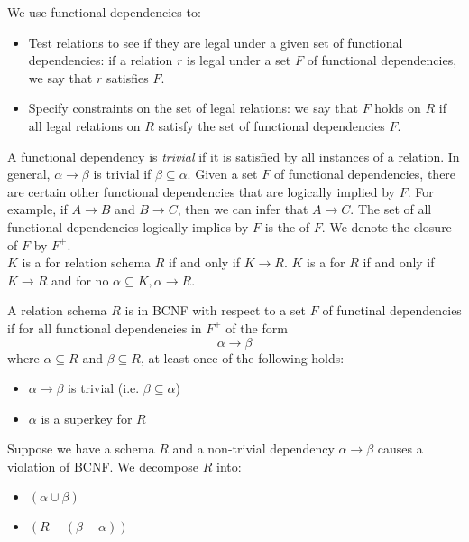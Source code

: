 \documentclass{article}
\begin{document}
We use functional dependencies to: 
\begin{itemize}
  \item Test relations to see if they are legal under a given set of functional dependencies: if a relation $r$ is legal under a set $F$ of functional dependencies, we say that $r$ satisfies $F$. 
  \item Specify constraints on the set of legal relations: we say that $F$ holds on $R$ if all legal relations on $R$ satisfy the set of functional dependencies $F$. 
\end{itemize}
A functional dependency is \emph{trivial} if it is satisfied by all instances of a relation. In general, $\alpha \rightarrow \beta$ is trivial if $\beta \subseteq \alpha$. Given a set $F$ of functional dependencies, there are certain other functional dependencies that are logically implied by $F$. For example, if $A \rightarrow B$ and $B \rightarrow C$, then we can infer that $A \rightarrow C$. The set of all functional dependencies logically implies by $F$ is the  of $F$. We denote the closure of $F$ by $F^{+}$. \\ 

$K$ is a  for relation schema $R$ if and only if $K \rightarrow R$. $K$ is a  for $R$ if and only if $K \rightarrow R$ and for no $\alpha \subseteq K, \alpha \rightarrow R$. \\

\begin{definition}
  A relation schema $R$ is in BCNF with respect to a set $F$ of functinal dependencies if for all functional dependencies in $F^{+}$ of the form $$\alpha \rightarrow \beta$$ where $\alpha \subseteq R$ and $\beta \subseteq R$, at least once of the following holds: 
  \begin{itemize}
    \item $\alpha \rightarrow \beta$ is trivial (i.e. $\beta \subseteq \alpha$) 
    \item $\alpha$ is a superkey for $R$
  \end{itemize}
  Suppose we have a schema $R$ and a non-trivial dependency $\alpha \rightarrow \beta$ causes a violation of BCNF. We decompose $R$ into: 
  \begin{itemize}
    \item $(\alpha \cup \beta)$ 
    \item $(R - (\beta - \alpha))$
  \end{itemize}
\end{definition}
\end{document}
